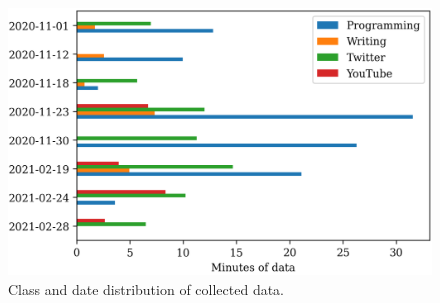         \begin{figure}[h]
            \centering
            \includegraphics[width=12cm]{img/naturalistic-dayclass-dist.png}
            \caption{Class and date distribution of collected data.}\label{figure:dayclass-dist}
        \end{figure}

        \vfill
